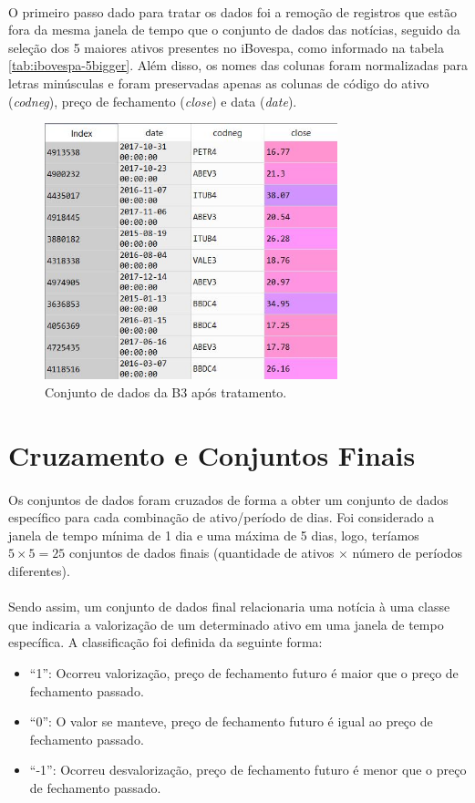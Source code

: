 \documentclass[grad,numbers]{coppe}
\begin{document}
  		\paragraph{}O primeiro passo dado para tratar os dados foi a remoção de registros que estão fora da mesma janela de tempo que o conjunto de dados das notícias, seguido da seleção dos 5 maiores ativos presentes no iBovespa, como informado na tabela \ref{tab:ibovespa-5bigger}. Além disso, os nomes das colunas foram normalizadas para letras minúsculas e foram preservadas apenas as colunas de código do ativo (\textit{codneg}), preço de fechamento (\textit{close}) e data (\textit{date}).
  		\begin{figure}[h]
  			\centering
  			{\includegraphics[width=8.5cm]{b3-pp-dataset}
  				\caption{Conjunto de dados da B3 após tratamento.}
  				\label{fig:b3-pp-dataset-fig}}
  		\end{figure}
  	\section{Cruzamento e Conjuntos Finais}\label{sec:cruzamento-e-conjuntos-finais}
  		\paragraph{}Os conjuntos de dados foram cruzados de forma a obter um conjunto de dados específico para cada combinação de ativo/período de dias. Foi considerado a janela de tempo mínima de 1 dia e uma máxima de 5 dias, logo, teríamos $5\times5=25$ conjuntos de dados finais (quantidade de ativos $\times$ número de períodos diferentes).
  		\paragraph{}Sendo assim, um conjunto de dados final relacionaria uma notícia à uma classe que indicaria a valorização de um determinado ativo em uma janela de tempo específica. A classificação foi definida da seguinte forma:
 			\begin{itemize}
  			\item ``1'': Ocorreu valorização, preço de fechamento futuro é maior que o preço de fechamento passado.
	 			\item ``0'': O valor se manteve, preço de fechamento futuro é igual ao preço de fechamento passado.
	 			\item ``-1'': Ocorreu desvalorização, preço de fechamento futuro é menor que o preço de fechamento passado.
  		\end{itemize}
\end{document}
